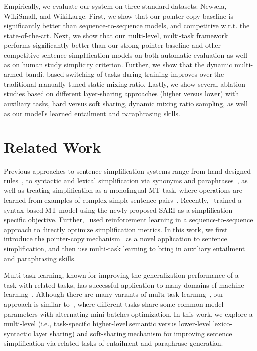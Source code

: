 \documentclass[11pt]{article}
\begin{document}
Empirically, we evaluate our system on three standard datasets: Newsela, WikiSmall, and WikiLarge. First, we show that our pointer-copy baseline is significantly better than sequence-to-sequence models, and competitive w.r.t. the state-of-the-art. Next, we show that our multi-level, multi-task framework performs significantly better than our strong pointer baseline and other competitive sentence simplification models on both automatic evaluation as well as on human study simplicity criterion. Further, we show that the dynamic multi-armed bandit based switching of tasks during training improves over the traditional manually-tuned static mixing ratio. Lastly, we show several ablation studies based on different layer-sharing approaches (higher versus lower) with auxiliary tasks, hard versus soft sharing, dynamic mixing ratio sampling, as well as our model's learned entailment and paraphrasing skills.
 
\section{Related Work}
\label{section:related-works}

Previous approaches to sentence simplification systems range from hand-designed rules~\cite{SIDDHARTHAN2006SyntacticSA}, to syntactic and lexical simplification via synonyms and paraphrases~\cite{Siddharthan2014ASO,kaji2002verb,horn2014learning,glavavs2015simplifying}, as well as treating simplification as a monolingual MT task, where operations are learned from examples of complex-simple sentence pairs~\cite{specia2010translating,koehn2007moses,coster2011learning,Zhu2010AMT,Wubben2012SentenceSB,Narayan2014HybridSU}. 
Recently,~ trained a syntax-based MT model using the newly proposed SARI as a simplification-specific objective. Further,~ used reinforcement learning in a sequence-to-sequence approach to directly optimize simplification metrics. In this work, we first introduce the pointer-copy mechanism~\cite{see2017get} as a novel application to sentence simplification, and then use multi-task learning to bring in auxiliary entailment and paraphrasing skills.


Multi-task learning, known for improving the generalization performance of a task with related tasks, has successful application to many domains of machine learning~\cite{caruana1998multitask,collobert2008unified,girshick2015fast,luong2015multi,pasunuru2017multitask,Pasunuru2017TowardsIA}. Although there are many variants of multi-task learning~\cite{ruder2017sluice,hashimoto2017ajm,luong2015multi}, 
our approach is similar to~, where different tasks share some common model parameters with alternating mini-batches optimization. 
In this work, we explore a multi-level (i.e., task-specific higher-level semantic versus lower-level lexico-syntactic layer sharing) and soft-sharing mechanism for improving sentence simplification via related tasks of entailment and paraphrase generation.
\end{document}
